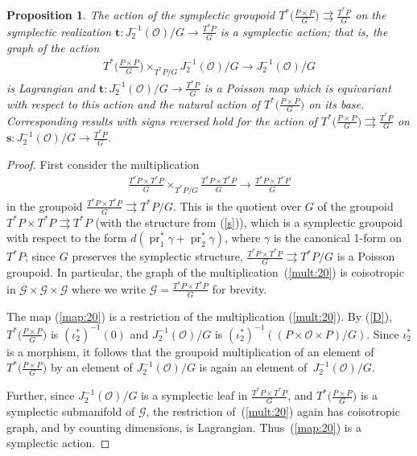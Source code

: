 \documentclass[pdftex]{sigma}
\newcommand{\Ss}{\textbf{s}}
\newcommand{\Tt}{\textbf{t}}
\renewcommand{\O}{\mathcal{O}}
\renewcommand{\to}{\rightarrow}
\newcommand{\tto}{\rightrightarrows}
\newcommand{\gold}{\mscr{G}}
\newcommand{\mscr}[1]{\mathscr{#1}}
\newcommand{\gpd}{\rightrightarrows}
\renewcommand{\Bar}[1]{\overline{#1}}
\numberwithin{equation}{section}
\newtheorem{Proposition}[Theorem]{Proposition}
 { \theoremstyle{definition}
\newtheorem{Definition}[Theorem]{Definition}
\newtheorem{Example}[Theorem]{Example}
\newtheorem{Remark}[Theorem]{Remark} }
\begin{document}
\begin{Proposition}\label{prop:20} The action of the symplectic groupoid $T^*\big(\frac{P\times P}{G}\big)\tto \frac{T^*P}{G}$ on the symplectic realization $\Tt\colon J_2^{-1}(\O)/G\to \frac{T^*P}{G}$ is a symplectic action; that is, the graph of the action
\begin{gather}\label{map:20}
T^*\big(\tfrac{P\times P}{G}\big)\times_{T^*P/G} J_2^{-1}(\O)/G\to J_2^{-1}(\O)/G
\end{gather}
is Lagrangian and $\Tt\colon J_2^{-1}(\O)/G\to \frac{T^*P}{G}$ is a Poisson map which is equivariant with respect to this action and the natural action of $T^*\big(\tfrac{P\times P}{G}\big)$ on its base. Corresponding results with signs reversed hold for the action of $T^*\big(\frac{P\times P}{G}\big)\tto \frac{T^*P}{G}$ on $\Ss\colon J_2^{-1}(\O)/G\to \frac{T^*P}{G}$.
\end{Proposition}

\begin{proof} First consider the multiplication
\begin{gather}\label{mult:20}
\tfrac{T^*P\times T^*P}{G}\times_{T^*P/G} \tfrac{T^*P\times T^*P}{G}\to \tfrac{T^*P\times T^*P}{G}
\end{gather}
in the groupoid $\tfrac{T^*P\times T^*P}{G}\gpd T^*P/G$. This is the quotient over $G$ of the groupoid $T^*P\times T^*P\gpd T^*P$ (with the structure from (\ref{s})), which is a symplectic groupoid with respect to the form $d(\operatorname{pr}_1^*\gamma+\operatorname{pr}_2^*\gamma)$, where $\gamma$ is the canonical 1-form on $T^*P$; since $G$ preserves the symplectic structure, $\tfrac{T^*P\times T^*P}{G}\gpd T^*P/G$ is a Poisson groupoid. In particular, the graph of the multiplication~(\ref{mult:20}) is coisotropic in $\Bar{\gold}\times\gold\times\gold$ where we write $\gold = \tfrac{T^*P\times T^*P}{G}$ for brevity.

The map (\ref{map:20}) is a restriction of the multiplication (\ref{mult:20}). By (\ref{D}), $T^*\big(\tfrac{P\times P}{G}\big)$ is $(\iota_2^*)^{-1}(0)$ and $J_2^{-1}(\O)/G$ is $(\iota_2^*)^{-1}((P\times \O\times P)/G)$. Since $\iota_2^*$ is a morphism, it follows that the groupoid multiplication of an element of $T^*\big(\tfrac{P\times P}{G}\big)$ by an element of $J_2^{-1}(\O)/G$ is again an element of~$J_2^{-1}(\O)/G$.

Further, since $J_2^{-1}(\O)/G$ is a symplectic leaf in $\tfrac{T^*P\times T^*P}{G}$, and $T^*\big(\tfrac{P\times P}{G}\big)$ is a symplectic submanifold of $\gold$, the restriction of~(\ref{mult:20}) again has coisotropic graph, and by counting dimensions, is Lagrangian. Thus~(\ref{map:20}) is a symplectic action.
\end{proof}
\end{document}
